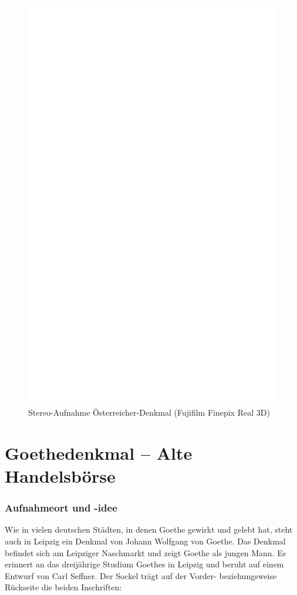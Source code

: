 \documentclass[liststotoc,bibtotoc,fontsize=14pt,]{scrreprt}
\begin{document}
\newpage
\begin{figure}[h]
	\includegraphics[width=\linewidth]{img/ph.jpg}
	\caption{Stereo-Aufnahme Österreicher-Denkmal (Fujifilm Finepix Real 3D)}
\end{figure}
	
	\section{Goethedenkmal -- Alte Handelsbörse}
	\label{sec:wagner}
	\subsubsection{Aufnahmeort und -idee}
	Wie in vielen deutschen Städten, in denen Goethe gewirkt und gelebt hat, steht auch in Leipzig ein Denkmal von Johann Wolfgang von Goethe. Das Denkmal befindet sich am Leipziger Naschmarkt und zeigt Goethe als jungen Mann. Es erinnert an das dreijährige Studium Goethes in Leipzig und beruht auf einem Entwurf von Carl Seffner. Der Sockel trägt auf der Vorder- beziehungsweise Rückseite die beiden Inschriften:
	
\end{document}
